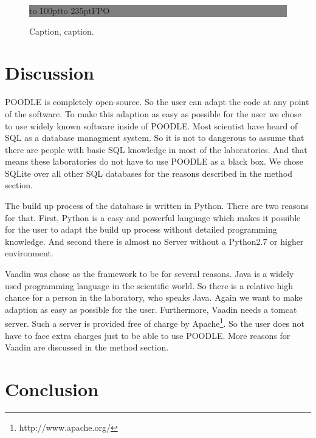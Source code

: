 \documentclass{bioinfo}
\begin{document}
\begin{figure}[!tpb]%
\fboxsep=0pt\colorbox{gray}{\begin{minipage}[t]{235pt} \vbox to 100pt{\vfill\hbox to
235pt{\hfill\fontsize{24pt}{24pt}\selectfont FPO\hfill}\vfill}
\end{minipage}}
\caption{Caption, caption.}\label{fig:01}
\end{figure}



\section{Discussion}

POODLE is completely open-source. So the user can adapt the code at any point of the software. To make 
this adaption as easy as possible for the user we chose to use widely known software inside of POODLE. 
Most scientist have heard of SQL as a database managment system. So it is not to dangerous to assume 
that there are people with basic SQL knowledge in most of the laboratories. And that means these 
laboratories do not have to use POODLE as a black box. We chose SQLite over all other SQL databases 
for the reasons described in the method section. 

The build up process of the database is written in Python. There are two reasons for that. First, 
Python is a easy and powerful language which makes it possible for the user to adapt the build up 
process without detailed programming knowledge. And second there is almost no 
Server without a Python2.7 or higher environment.

Vaadin was chose as the framework to be for several reasons. Java is a widely used programming language 
in the scientific world. So there is a relative high chance for a person in the laboratory, who speaks 
Java. Again we want to make adaption as easy as possible for the user. Furthermore, Vaadin needs a 
tomcat server. Such a server is provided free of charge by Apache\footnote{http://www.apache.org/}. 
So the user does not have to face extra charges just to be able to use POODLE. More reasons for 
Vaadin are discussed in the method section.

\section{Conclusion}
\end{document}
